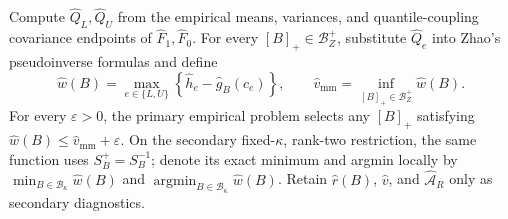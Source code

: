 Compute \(\widehat Q_L,\widehat Q_U\) from the empirical means, variances, and quantile-coupling covariance endpoints of \(\widehat F_1,\widehat F_0\).  For every \([B]_+\in\mathcal B_Z^+\), substitute \(\widehat Q_e\) into Zhao's pseudoinverse formulas and define
\[
\widehat w(B)=\max_{e\in\{L,U\}}\left\{\widehat h_e-\widehat g_B(c_e)\right\},
\qquad
\widehat v_{\mathrm{mm}}=\inf_{[B]_+\in\mathcal B_Z^+}\widehat w(B).
\]
For every \(\varepsilon>0\), the primary empirical problem selects any \([B]_+\) satisfying \(\widehat w(B)\le\widehat v_{\mathrm{mm}}+\varepsilon\).  On the secondary fixed-\(\kappa\), rank-two restriction, the same function uses \(S_B^+=S_B^{-1}\); denote its exact minimum and argmin locally by \(\min_{B\in\mathcal B_\kappa}\widehat w(B)\) and \(\operatorname*{argmin}_{B\in\mathcal B_\kappa}\widehat w(B)\).  Retain \(\widehat r(B)\), \(\widehat v\), and \(\widehat{\mathcal A}_R\) only as secondary diagnostics.